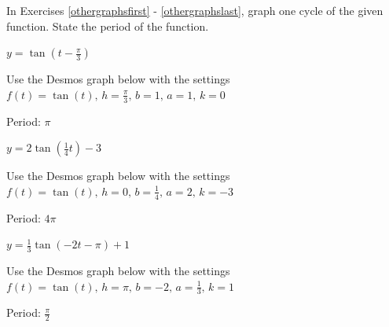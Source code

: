\documentclass{ximera}
\begin{document}
	\author{Stitz-Zeager}


\begin{question}
    
In Exercises \ref{othergraphsfirst} - \ref{othergraphslast}, graph one cycle of the given function.  State the period of the function.

\begin{problem}\label{othergraphsfirst}
    $y = \tan \left(t - \frac{\pi}{3} \right)$

\begin{solution}
Use the Desmos graph below with the settings $f(t)=\tan(t),\,h=\frac{\pi}{3},\,b=1,\,a=1,\,k=0$

\begin{center} 
\end{center}

Period: $\pi$\\
\end{solution}
\end{problem}

\begin{problem}
    $y = 2\tan \left( \frac{1}{4}t \right) - 3$

\begin{solution}
Use the Desmos graph below with the settings $f(t)=\tan(t),\,h=0,\,b=\frac{1}{4},\,a=2,\,k=-3$

\begin{center} 
\end{center}

Period: $4\pi$\\
\end{solution}
\end{problem}

\begin{problem}
     $y = \frac{1}{3}\tan(-2t - \pi) + 1$

\begin{solution}
Use the Desmos graph below with the settings $f(t)=\tan(t),\,h=\pi,\,b=-2,\,a=\frac{1}{3},\,k=1$

\begin{center} 
\end{center}

Period: $\frac{\pi}{2}$\\
\end{solution}
\end{problem}


\end{question}
\end{document}

